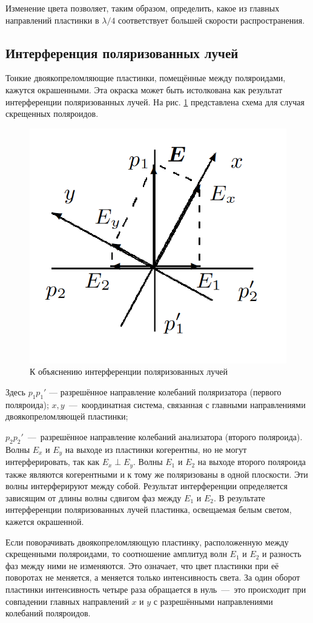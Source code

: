 \documentclass[a4paper,12pt]{article}
\begin{document}
Изменение цвета позволяет, таким образом, определить, какое из
главных направлений пластинки в $ \lambda/4 $ соответствует большей скорости
распространения.

\subsection*{Интерференция поляризованных лучей}

Тонкие двоякопреломляющие пластинки, помещённые между поляроидами, кажутся окрашенными. Эта окраска может быть истолкована как результат интерференции поляризованных лучей. На рис. \ref{ris 4} представлена схема для случая скрещенных поляроидов.

\begin{figure}[h] 
	\centering
	\includegraphics[width=0.3\linewidth]{4}
	\caption{К объяснению интерференции поляризованных лучей}
	\label{ris 4}
\end{figure}

Здесь $ p_1p_1' $ --- разрешённое направление колебаний поляризатора
(первого поляроида); $ x, y $~---~координатная система, связанная с главными направлениями двоякопреломляющей пластинки;

$ p_2p_2' $~---~разрешённое направление колебаний анализатора (второго поляроида). Волны $ E_x  $ и $ E_y $ на выходе из пластинки когерентны, но не могут интерферировать, так как $ E_x \perp  E_y $. Волны $ E_1 $ и $ E_2 $ на выходе второго поляроида также являются когерентными и к тому же поляризованы в одной плоскости. Эти волны интерферируют между собой. Результат интерференции определяется зависящим от длины волны сдвигом фаз между $ E_1 $ и $ E_2 $. В результате интерференции поляризованных лучей пластинка, освещаемая белым светом, кажется окрашенной.

Если поворачивать двоякопреломляющую пластинку, расположенную между
скрещенными поляроидами, то соотношение амплитуд волн $ E_1 $ и $ E_2 $ и разность фаз между ними не изменяются. Это означает, что цвет пластинки при её поворотах не меняется, а меняется только интенсивность света. За один оборот пластинки интенсивность четыре раза обращается в нуль~---~это происходит при совпадении главных направлений
$ x $ и $ y $ с разрешёнными направлениями колебаний поляроидов.
\end{document}
